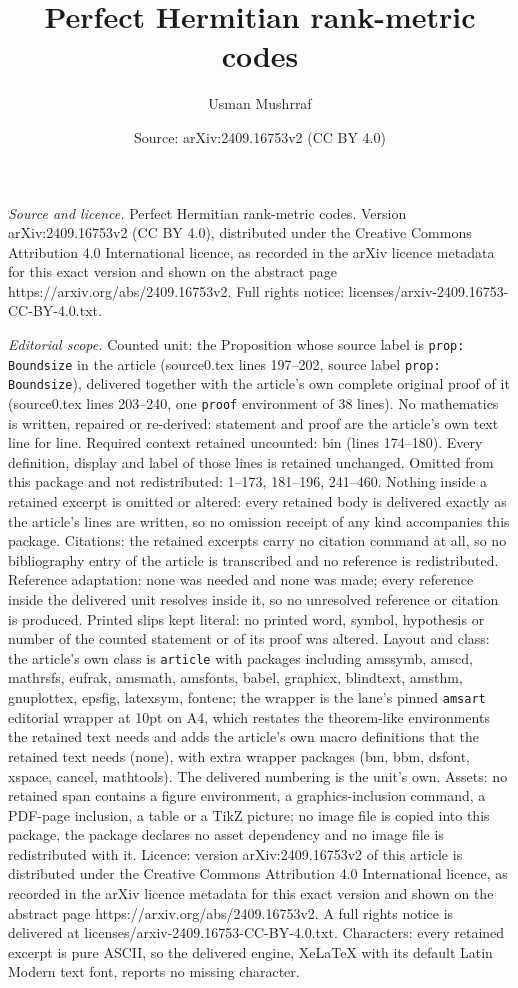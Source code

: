 \documentclass[10pt,a4paper]{amsart}
\title[Perfect Hermitian rank-metric codes]{Perfect Hermitian rank-metric codes}
\author{Usman Mushrraf}
\date{Source: arXiv:2409.16753v2 (CC BY 4.0)}
\begin{document}
\maketitle

\noindent\emph{Source and licence.} Perfect Hermitian rank-metric codes. Version arXiv:2409.16753v2 (CC BY 4.0), distributed under the Creative Commons Attribution 4.0 International licence, as recorded in the arXiv licence metadata for this exact version and shown on the abstract page https://arxiv.org/abs/2409.16753v2. Full rights notice: licenses/arxiv-2409.16753-CC-BY-4.0.txt.\par\smallskip

\noindent\textit{Editorial scope.} Counted unit: the Proposition whose source label is \texttt{prop: Boundsize} in the article (source0.tex lines 197--202, source label \texttt{prop: Boundsize}), delivered together with the article's own complete original proof of it (source0.tex lines 203--240, one \texttt{proof} environment of 38 lines). No mathematics is written, repaired or re-derived: statement and proof are the article's own text line for line. Required context retained uncounted: bin (lines 174--180). Every definition, display and label of those lines is retained unchanged. Omitted from this package and not redistributed: 1--173, 181--196, 241--460. Nothing inside a retained excerpt is omitted or altered: every retained body is delivered exactly as the article's lines are written, so no omission receipt of any kind accompanies this package. Citations: the retained excerpts carry no citation command at all, so no bibliography entry of the article is transcribed and no reference is redistributed. Reference adaptation: none was needed and none was made; every reference inside the delivered unit resolves inside it, so no unresolved reference or citation is produced. Printed slips kept literal: no printed word, symbol, hypothesis or number of the counted statement or of its proof was altered. Layout and class: the article's own class is \texttt{article} with packages including amssymb, amscd, mathrsfs, eufrak, amsmath, amsfonts, babel, graphicx, blindtext, amsthm, gnuplottex, epsfig, latexsym, fontenc; the wrapper is the lane's pinned \texttt{amsart} editorial wrapper at 10pt on A4, which restates the theorem-like environments the retained text needs and adds the article's own macro definitions that the retained text needs (none), with extra wrapper packages (bm, bbm, dsfont, xspace, cancel, mathtools). The delivered numbering is the unit's own. Assets: no retained span contains a figure environment, a graphics-inclusion command, a PDF-page inclusion, a table or a TikZ picture; no image file is copied into this package, the package declares no asset dependency and no image file is redistributed with it. Licence: version arXiv:2409.16753v2 of this article is distributed under the Creative Commons Attribution 4.0 International licence, as recorded in the arXiv licence metadata for this exact version and shown on the abstract page https://arxiv.org/abs/2409.16753v2. A full rights notice is delivered at licenses/arxiv-2409.16753-CC-BY-4.0.txt. Characters: every retained excerpt is pure ASCII, so the delivered engine, XeLaTeX with its default Latin Modern text font, reports no missing character.
\end{document}
